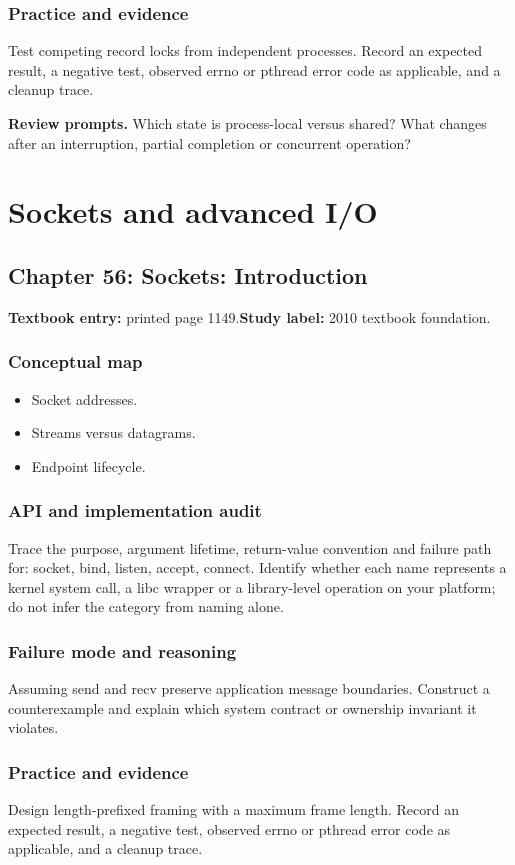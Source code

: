 \documentclass[11pt,letterpaper,oneside]{report}
\begin{document}
\subsection{Practice and evidence}
Test competing record locks from independent processes. Record an expected result, a negative test, observed errno or pthread error code as applicable, and a cleanup trace.

\textbf{Review prompts.} Which state is process-local versus shared? What changes after an interruption, partial completion or concurrent operation?

\chapter{Sockets and advanced I/O}
\section{Chapter 56: Sockets: Introduction}
\textbf{Textbook entry:} printed page 1149.\quad \textbf{Study label:} 2010 textbook foundation.

\subsection{Conceptual map}
\begin{itemize}
\item Socket addresses.
\item Streams versus datagrams.
\item Endpoint lifecycle.
\end{itemize}
\subsection{API and implementation audit}
Trace the purpose, argument lifetime, return-value convention and failure path for: socket, bind, listen, accept, connect. Identify whether each name represents a kernel system call, a libc wrapper or a library-level operation on your platform; do not infer the category from naming alone.

\subsection{Failure mode and reasoning}
Assuming send and recv preserve application message boundaries. Construct a counterexample and explain which system contract or ownership invariant it violates.

\subsection{Practice and evidence}
Design length-prefixed framing with a maximum frame length. Record an expected result, a negative test, observed errno or pthread error code as applicable, and a cleanup trace.
\end{document}
